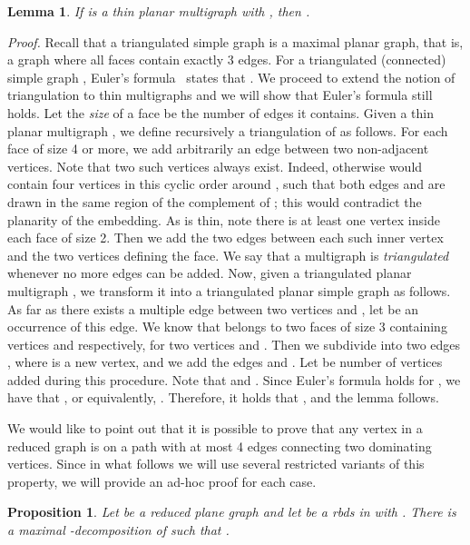 \documentclass[a4paper,11pt]{article}
\newtheorem{lem}  {Lemma}
\newtheorem{prop} {Proposition}
\newcommand{\drb}    [0] {rbds\xspace}
\newenvironment{proof}{\noindent \textit{Proof. }}{\hfill\vspace{.2cm}}
\begin{document}
\begin{lem}\label{fait_thin}
If  is a thin planar multigraph with , then .
\end{lem}

\begin{proof}
Recall that a triangulated simple graph is a maximal planar graph, that is, a graph where all faces contain exactly 3 edges.
For a triangulated (connected) simple graph , Euler's formula~\cite{Die05} states that  . We proceed to extend the notion of triangulation to thin multigraphs and we will show that Euler's formula still holds.
Let the \emph{size} of a face be the number of edges it contains. Given a thin planar multigraph , we define recursively a triangulation  of  as follows. For each face  of size 4 or more, we add arbitrarily an edge between two non-adjacent vertices. Note that two such vertices always exist. Indeed, otherwise  would contain four vertices  in this cyclic order around , such that both edges  and  are drawn in the same region of the complement of ; this would contradict the planarity of the embedding. As  is thin, note there is at least one vertex inside each face of size 2. Then we add the two edges between each such inner vertex and the two vertices defining the face. We say that a multigraph is \emph{triangulated} whenever no more edges can be added.
Now, given a triangulated planar multigraph , we transform it into a triangulated planar simple graph  as follows. As far as there exists a multiple edge between two vertices  and , let  be an occurrence  of this edge. We know that  belongs to two faces of size 3 containing vertices  and  respectively, for two vertices  and . Then we subdivide  into two edges , where  is a new vertex, and we add the edges  and  . Let  be number of vertices added during this procedure. Note that  and . Since Euler's formula holds for , we have that , or equivalently, . Therefore, it holds that , and the lemma follows.
\end{proof}


We would like to point out that it is possible to prove that any vertex in a reduced graph is on a path with at most 4 edges connecting two dominating vertices. Since in what follows we will use several restricted variants of this property, we will provide an ad-hoc proof for each case.



\begin{prop} \label{prop_nb_reg}
Let  be a reduced plane graph and let  be a \drb in  with .
There is a maximal -decomposition of  such that .
\end{prop}
\end{document}
